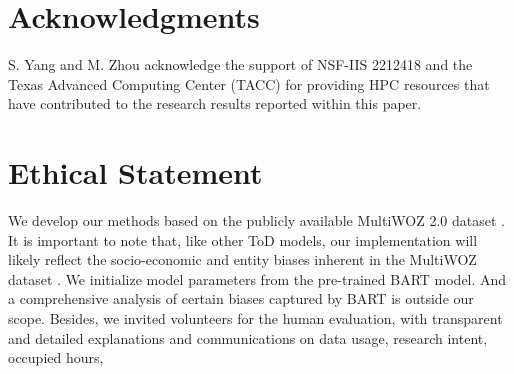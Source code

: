 
\section*{Acknowledgments} 
S. Yang and M. Zhou acknowledge the support of NSF-IIS 2212418 and the Texas Advanced Computing Center (TACC) for providing HPC resources that have contributed to the research results
reported within this paper.

\section*{Ethical Statement} 
We develop our methods based on the publicly available MultiWOZ 2.0 dataset \citep{multiwoz2018}. It is important to note that, like other ToD models, our implementation will likely reflect the socio-economic and entity biases inherent in the MultiWOZ dataset \citep{qian2021annotation}. We initialize model parameters from the pre-trained BART model. 
And a comprehensive analysis of certain biases captured by BART is outside our scope. 
Besides, we invited volunteers for the human evaluation, with transparent and detailed explanations and communications on data usage, research intent, occupied hours, \etc


